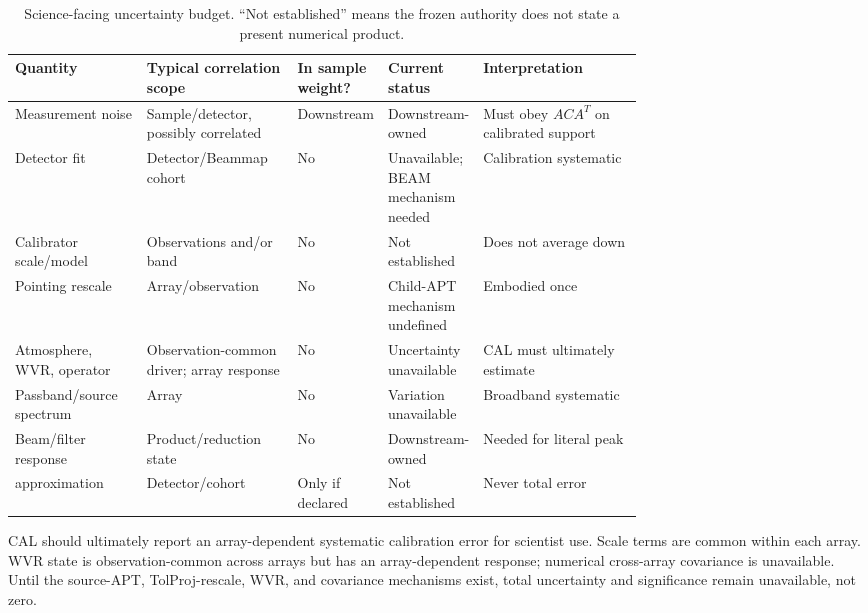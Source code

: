 \documentclass[11pt]{article}
\begin{document}
\begin{table}[ht]\centering\small
\caption{Science-facing uncertainty budget. ``Not established'' means the frozen authority does not state a present numerical product.}\label{tab:uncertainty-budget}
\begin{tabularx}{\linewidth}{@{}L{0.21\linewidth}L{0.24\linewidth}L{0.13\linewidth}L{0.15\linewidth}Y@{}}
\toprule Quantity & Typical correlation scope & In sample weight? & Current status & Interpretation \\
\midrule
Measurement noise & Sample/detector, possibly correlated & Downstream & Downstream-owned & Must obey \(A C A^T\) on calibrated support \\
Detector  fit & Detector/Beammap cohort & No & Unavailable; BEAM mechanism needed & Calibration systematic \\
Calibrator scale/model & Observations and/or band & No & Not established & Does not average down \\
Pointing rescale & Array/observation & No & Child-APT mechanism undefined & Embodied once \\
Atmosphere, WVR, operator & Observation-common driver; array response & No & Uncertainty unavailable & CAL must ultimately estimate \\
Passband/source spectrum & Array & No & Variation unavailable & Broadband systematic \\
Beam/filter response & Product/reduction state & No & Downstream-owned & Needed for literal peak \\
 approximation & Detector/cohort & Only if declared & Not established & Never total error \\
\bottomrule\end{tabularx}\end{table}

CAL should ultimately report an array-dependent systematic calibration error
for scientist use. Scale terms are common within each array. WVR state is
observation-common across arrays but has an array-dependent response;
numerical cross-array covariance is unavailable. Until the source-APT,
TolProj-rescale, WVR, and covariance mechanisms exist, total uncertainty and
significance remain unavailable, not zero.
\end{document}
